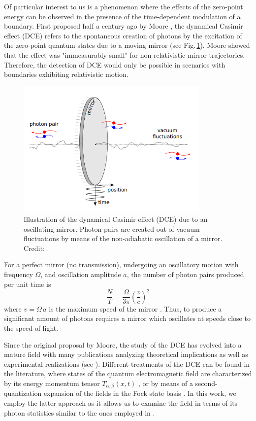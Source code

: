 Of particular interest to us is a phenomenon where the effects of the zero-point energy can be observed in the presence of the time-dependent modulation of a boundary. First proposed half a century ago by Moore \cite{Moore1970}, the dynamical Casimir effect (DCE) refers to the spontaneous creation of photons by the excitation of the zero-point quantum states due to a moving mirror (see Fig.\,\ref{fig:Nation_movingmiror}). Moore showed that the effect was "immeasurably small" for non-relativistic mirror trajectories. Therefore, the detection of DCE would only be possible in scenarios with boundaries exhibiting relativistic motion.
%
\begin{figure}
    \centering
    \includegraphics[width = 3.7in, keepaspectratio]{figures/intro/Nation2011_DCE.png}
    \caption{Illustration of the dynamical Casimir effect (DCE) due to an oscillating mirror. 
    Photon pairs are created out of vacuum fluctuations by means of the non-adiabatic oscillation of a mirror. Credit: \protect\cite{Nation2011}.}
    \label{fig:Nation_movingmiror}
\end{figure}
\newpage
\noindent
For a perfect mirror (no transmission), undergoing an oscillatory motion with frequency $\Omega$, and oscillation amplitude $a$, 
the number of photon pairs produced per unit time is
%
\begin{equation}
    \frac{N}{T} = \frac{\Omega}{3\pi}\left(\frac{v}{c}\right)^2 
\end{equation}
%
where $v = \Omega \, a$ is the maximum speed of the mirror \cite{Lambrecht1996}. Thus, to produce a significant amount of photons requires
a mirror which oscillates at speeds close to the speed of light.

Since the original proposal by Moore, the study of the DCE has evolved into a mature field with many publications analyzing theoretical implications as well as experimental realizations (see \cite{Dodonov_Review2020}). Different treatments of the DCE can be found in the literature, where states of the quantum electromagnetic field are characterized by its energy momentum tensor $T_{\alpha, \beta}(x,t)$ \cite{Fulling&Davies1976}, or by means of a second-quantization expansion of the fields in the Fock state basis \cite{Dodonov1990}. In this work, we employ the latter approach as it allows us to examine the field in terms of its photon statistics similar to the ones employed in \cite{Dodonov1990,Lambrecht1996, Nation2011}.

